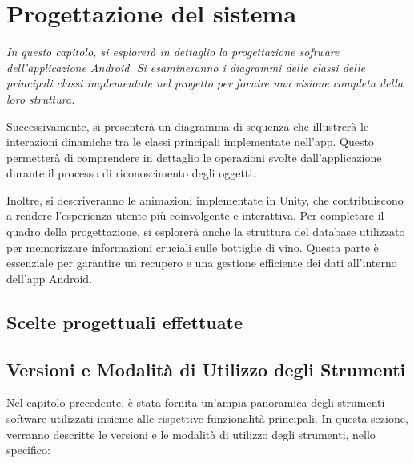 \chapter{Progettazione del sistema}

\begin{preamble}
{\em 
In questo capitolo, si esplorerà in dettaglio la progettazione software dell'applicazione Android. Si esamineranno i diagrammi delle classi delle principali classi implementate nel progetto per fornire una visione completa della loro struttura.

Successivamente, si presenterà un diagramma di sequenza che illustrerà le interazioni dinamiche tra le classi principali implementate nell'app. Questo permetterà di comprendere in dettaglio le operazioni svolte dall'applicazione durante il processo di riconoscimento degli oggetti.

Inoltre, si descriveranno le animazioni implementate in Unity, che contribuiscono a rendere l'esperienza utente più coinvolgente e interattiva. Per completare il quadro della progettazione, si esplorerà anche la struttura del database utilizzato per memorizzare informazioni cruciali sulle bottiglie di vino. Questa parte è essenziale per garantire un recupero e una gestione efficiente dei dati all'interno dell'app Android.
}
\end{preamble}

\section{Scelte progettuali effettuate}

\section{Versioni e Modalità di Utilizzo degli Strumenti}

Nel capitolo precedente, è stata fornita un'ampia panoramica degli strumenti software utilizzati insieme alle rispettive funzionalità principali. In questa sezione, verranno descritte le versioni e le modalità di utilizzo degli strumenti, nello specifico:

